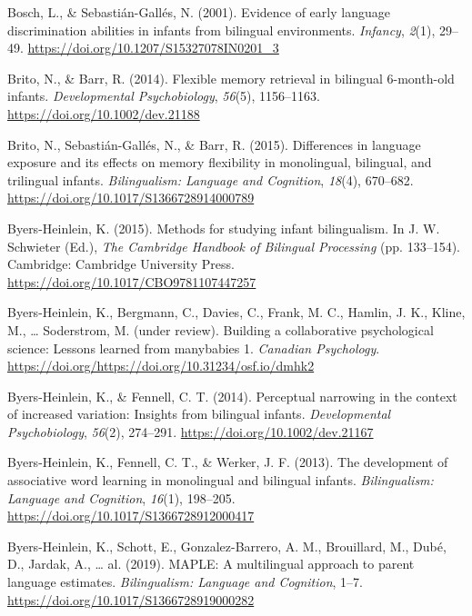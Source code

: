 \documentclass[,man,floatsintext]{apa6}
\begin{document}
\leavevmode\hypertarget{ref-bosch_2001}{}%
Bosch, L., \& Sebastián-Gallés, N. (2001). Evidence of early language discrimination abilities in infants from bilingual environments. \emph{Infancy}, \emph{2}(1), 29--49. \url{https://doi.org/10.1207/S15327078IN0201_3}

\leavevmode\hypertarget{ref-brito_2014}{}%
Brito, N., \& Barr, R. (2014). Flexible memory retrieval in bilingual 6-month-old infants. \emph{Developmental Psychobiology}, \emph{56}(5), 1156--1163. \url{https://doi.org/10.1002/dev.21188}

\leavevmode\hypertarget{ref-brito_2015}{}%
Brito, N., Sebastián-Gallés, N., \& Barr, R. (2015). Differences in language exposure and its effects on memory flexibility in monolingual, bilingual, and trilingual infants. \emph{Bilingualism: Language and Cognition}, \emph{18}(4), 670--682. \url{https://doi.org/10.1017/S1366728914000789}

\leavevmode\hypertarget{ref-byers_heinlein_2015}{}%
Byers-Heinlein, K. (2015). Methods for studying infant bilingualism. In J. W. Schwieter (Ed.), \emph{The Cambridge Handbook of Bilingual Processing} (pp. 133--154). Cambridge: Cambridge University Press. \url{https://doi.org/10.1017/CBO9781107447257}

\leavevmode\hypertarget{ref-byers_heinlein_et_al_2019}{}%
Byers-Heinlein, K., Bergmann, C., Davies, C., Frank, M. C., Hamlin, J. K., Kline, M., \ldots{} Soderstrom, M. (under review). Building a collaborative psychological science: Lessons learned from manybabies 1. \emph{Canadian Psychology}. \url{https://doi.org/https://doi.org/10.31234/osf.io/dmhk2}

\leavevmode\hypertarget{ref-byers_heinlein_2014}{}%
Byers-Heinlein, K., \& Fennell, C. T. (2014). Perceptual narrowing in the context of increased variation: Insights from bilingual infants. \emph{Developmental Psychobiology}, \emph{56}(2), 274--291. \url{https://doi.org/10.1002/dev.21167}

\leavevmode\hypertarget{ref-byers_heinlein_2013}{}%
Byers-Heinlein, K., Fennell, C. T., \& Werker, J. F. (2013). The development of associative word learning in monolingual and bilingual infants. \emph{Bilingualism: Language and Cognition}, \emph{16}(1), 198--205. \url{https://doi.org/10.1017/S1366728912000417}

\leavevmode\hypertarget{ref-byers_heinlein_2019}{}%
Byers-Heinlein, K., Schott, E., Gonzalez-Barrero, A. M., Brouillard, M., Dubé, D., Jardak, A., \ldots{} al. (2019). MAPLE: A multilingual approach to parent language estimates. \emph{Bilingualism: Language and Cognition}, 1--7. \url{https://doi.org/10.1017/S1366728919000282}
\end{document}
